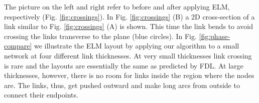 \documentclass[nofootinbib,preprint,floatfix,endfloats]{revtex4} %
\begin{document}
The picture on the left and right refer to before and after applying ELM, respectively (Fig. \ref{fig:crossings}). In Fig. \ref{fig:crossings} (B) a 2D cross-section of a link similar to  Fig. \ref{fig:crossings} (A) is shown.
This time the link bends to avoid crossing the links transverse to the plane (blue circles). 
%
%
In Fig. \ref{fig:phase-compare} we illustrate the ELM layout by applying our algorithm to a small %
network %
at four different link thicknesses. At very small thicknesses link crossing is rare and the layouts are essentially the same as predicted by FDL. At large thicknesses, however, there is no room for links inside the region where the nodes are. The links, thus, get pushed outward and make long arcs from outside to connect their endpoints.
\end{document}
